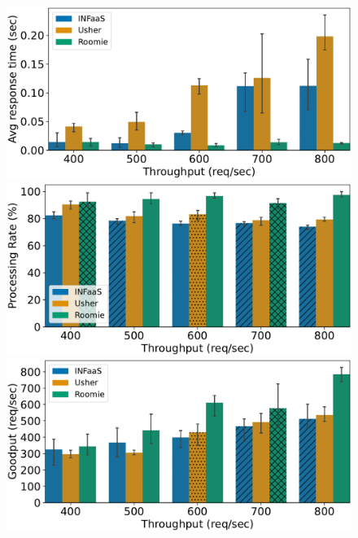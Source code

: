 \begin{figure}
	\begin{minipage}[t]{.24\linewidth}
		\centering
		\includegraphics[width=\linewidth]{chapters/roomie/images/JetsonNano/synthetic-all-models/response_time.pdf}
	\end{minipage}
	\hfill
	\begin{minipage}[t]{.24\linewidth}
		\centering
		\includegraphics[width=\linewidth]{chapters/roomie/images/JetsonNano/synthetic-all-models/normalized.pdf}
	\end{minipage}
	\hfill
	\begin{minipage}[t]{.24\linewidth}
		\centering
		\includegraphics[width=\linewidth]{chapters/roomie/images/JetsonNano/synthetic-all-models/goodput.pdf}

\end{minipage}
\end{figure}
